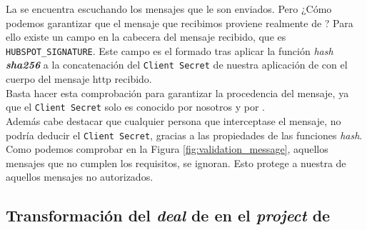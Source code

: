 La \iface{} se encuentra escuchando los mensajes que le son enviados. Pero ¿Cómo podemos garantizar que el mensaje que recibimos proviene realmente de \hs{}?
Para ello existe un campo en la cabecera del mensaje recibido, que es \texttt{HUBSPOT\_SIGNATURE}. 
Este campo es el formado tras aplicar la función \textit{hash \textbf{sha256}} a la concatenación del \texttt{Client Secret} de nuestra aplicación de \hs{} con el cuerpo del mensaje \acrshort{http} recibido.\\

Basta hacer esta comprobación para garantizar la procedencia del mensaje, ya que el \texttt{Client Secret} solo es conocido por nosotros y por \hs{}. \\

Además cabe destacar que cualquier persona que interceptase el mensaje, no podría deducir el \texttt{Client Secret}, gracias a las propiedades de las funciones \textit{hash}.\\ 




Como podemos comprobar en la Figura \ref{fig:validation_message}, aquellos mensajes que no cumplen los requisitos, se ignoran. Esto protege a nuestra \iface{} de aquellos mensajes no autorizados.




\subsection{Transformación del \textit{deal} de \hs{} en el \textit{project} de \wday{}}

